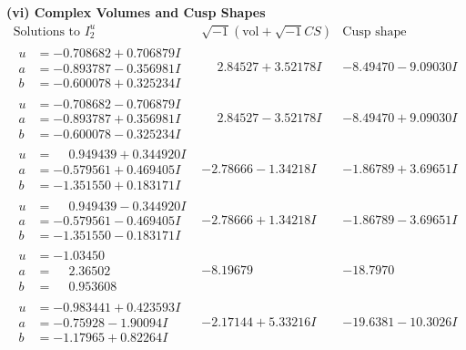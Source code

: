 \documentclass[1p]{elsarticle_modified}
\theoremstyle{definition}
\newcommand{\I}{\sqrt{-1}}
\begin{document}
\newpage\flushleft \textbf{(vi) Complex Volumes and Cusp Shapes}
$$\begin{array}{c|c|c}  
\text{Solutions to }I^u_{2}& \I (\text{vol} + \sqrt{-1}CS) & \text{Cusp shape}\\
 \hline 
\begin{aligned}
u &= -0.708682 + 0.706879 I \\
a &= -0.893787 - 0.356981 I \\
b &= -0.600078 + 0.325234 I\end{aligned}
 & \phantom{-}2.84527 + 3.52178 I & -8.49470 - 9.09030 I \\ \hline\begin{aligned}
u &= -0.708682 - 0.706879 I \\
a &= -0.893787 + 0.356981 I \\
b &= -0.600078 - 0.325234 I\end{aligned}
 & \phantom{-}2.84527 - 3.52178 I & -8.49470 + 9.09030 I \\ \hline\begin{aligned}
u &= \phantom{-}0.949439 + 0.344920 I \\
a &= -0.579561 + 0.469405 I \\
b &= -1.351550 + 0.183171 I\end{aligned}
 & -2.78666 - 1.34218 I & -1.86789 + 3.69651 I \\ \hline\begin{aligned}
u &= \phantom{-}0.949439 - 0.344920 I \\
a &= -0.579561 - 0.469405 I \\
b &= -1.351550 - 0.183171 I\end{aligned}
 & -2.78666 + 1.34218 I & -1.86789 - 3.69651 I \\ \hline\begin{aligned}
u &= -1.03450\phantom{ +0.000000I} \\
a &= \phantom{-}2.36502\phantom{ +0.000000I} \\
b &= \phantom{-}0.953608\phantom{ +0.000000I}\end{aligned}
 & -8.19679\phantom{ +0.000000I} & -18.7970\phantom{ +0.000000I} \\ \hline\begin{aligned}
u &= -0.983441 + 0.423593 I \\
a &= -0.75928 - 1.90094 I \\
b &= -1.17965 + 0.82264 I\end{aligned}
 & -2.17144 + 5.33216 I & -19.6381 - 10.3026 I \\ \hline\begin{aligned}

\end{aligned}
\end{array}$$
\end{document}
